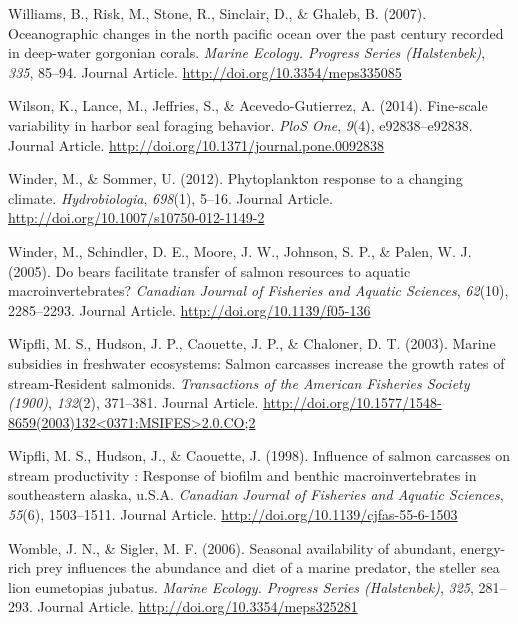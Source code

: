 \documentclass [11pt, proquest] {uwthesis}[2015/03/03]
\begin{document}
\hypertarget{ref-Williams2007}{}
Williams, B., Risk, M., Stone, R., Sinclair, D., \& Ghaleb, B. (2007).
Oceanographic changes in the north pacific ocean over the past century
recorded in deep-water gorgonian corals. \emph{Marine Ecology. Progress
Series (Halstenbek)}, \emph{335}, 85--94. Journal Article.
\url{http://doi.org/10.3354/meps335085}

\hypertarget{ref-Wilson2014}{}
Wilson, K., Lance, M., Jeffries, S., \& Acevedo-Gutierrez, A. (2014).
Fine-scale variability in harbor seal foraging behavior. \emph{PloS
One}, \emph{9}(4), e92838--e92838. Journal Article.
\url{http://doi.org/10.1371/journal.pone.0092838}

\hypertarget{ref-Winder2012}{}
Winder, M., \& Sommer, U. (2012). Phytoplankton response to a changing
climate. \emph{Hydrobiologia}, \emph{698}(1), 5--16. Journal Article.
\url{http://doi.org/10.1007/s10750-012-1149-2}

\hypertarget{ref-Winder2005}{}
Winder, M., Schindler, D. E., Moore, J. W., Johnson, S. P., \& Palen, W.
J. (2005). Do bears facilitate transfer of salmon resources to aquatic
macroinvertebrates? \emph{Canadian Journal of Fisheries and Aquatic
Sciences}, \emph{62}(10), 2285--2293. Journal Article.
\url{http://doi.org/10.1139/f05-136}

\hypertarget{ref-Wipfli2003}{}
Wipfli, M. S., Hudson, J. P., Caouette, J. P., \& Chaloner, D. T.
(2003). Marine subsidies in freshwater ecosystems: Salmon carcasses
increase the growth rates of stream‐Resident salmonids.
\emph{Transactions of the American Fisheries Society (1900)},
\emph{132}(2), 371--381. Journal Article.
\href{http://doi.org/10.1577/1548-8659(2003)132\%3C0371:MSIFES\%3E2.0.CO;2}{http://doi.org/10.1577/1548-8659(2003)132\textless{}0371:MSIFES\textgreater{}2.0.CO;2}

\hypertarget{ref-Wipfli1998}{}
Wipfli, M. S., Hudson, J., \& Caouette, J. (1998). Influence of salmon
carcasses on stream productivity : Response of biofilm and benthic
macroinvertebrates in southeastern alaska, u.S.A. \emph{Canadian Journal
of Fisheries and Aquatic Sciences}, \emph{55}(6), 1503--1511. Journal
Article. \url{http://doi.org/10.1139/cjfas-55-6-1503}

\hypertarget{ref-Womble2006}{}
Womble, J. N., \& Sigler, M. F. (2006). Seasonal availability of
abundant, energy-rich prey influences the abundance and diet of a marine
predator, the steller sea lion eumetopias jubatus. \emph{Marine Ecology.
Progress Series (Halstenbek)}, \emph{325}, 281--293. Journal Article.
\url{http://doi.org/10.3354/meps325281}
\end{document}
